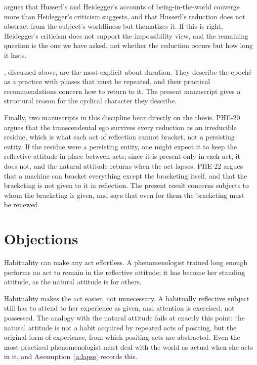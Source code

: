 \documentclass{situationist-preprint}
\begin{document}
\citet{Overgaard2004} argues that Husserl's and Heidegger's accounts of being-in-the-world converge more than Heidegger's criticism suggests, and that Husserl's reduction does not abstract from the subject's worldliness but thematizes it. If this is right, Heidegger's criticism does not support the impossibility view, and the remaining question is the one we have asked, not whether the reduction occurs but how long it lasts.

\citet{Depraz2003}, discussed above, are the most explicit about duration. They describe the epoché as a practice with phases that must be repeated, and their practical recommendations concern how to return to it. The present manuscript gives a structural reason for the cyclical character they describe.

Finally, two manuscripts in this discipline bear directly on the thesis. PHE-20 argues that the transcendental ego survives every reduction as an irreducible residue, which is what each act of reflection cannot bracket, not a persisting entity. If the residue were a persisting entity, one might expect it to keep the reflective attitude in place between acts; since it is present only in each act, it does not, and the natural attitude returns when the act lapses. PHE-22 argues that a machine can bracket everything except the bracketing itself, and that the bracketing is not given to it in reflection. The present result concerns subjects to whom the bracketing is given, and says that even for them the bracketing must be renewed.

\section{Objections}\label{s:objections}

\begin{objection}
Habituality can make any act effortless. A phenomenologist trained long enough performs no act to remain in the reflective attitude; it has become her standing attitude, as the natural attitude is for others.
\end{objection}

\begin{reply}
Habituality makes the act easier, not unnecessary. A habitually reflective subject still has to attend to her experience as given, and attention is exercised, not possessed. The analogy with the natural attitude fails at exactly this point: the natural attitude is not a habit acquired by repeated acts of positing, but the original form of experience, from which positing acts are abstracted. Even the most practised phenomenologist must deal with the world as actual when she acts in it, and Assumption~\ref{a:lapse} records this.
\end{reply}
\end{document}
